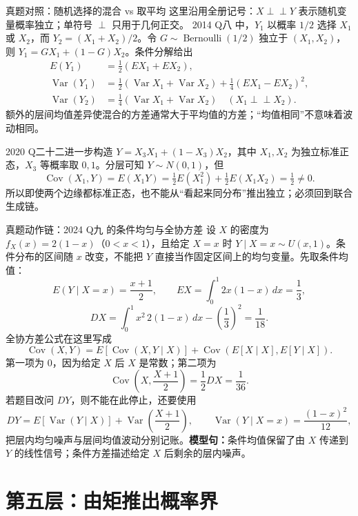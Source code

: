 \documentclass[11pt,a4paper]{ctexart}
\newcommand{\kw}[1]{\textbf{\color{deep}#1}}
\newcommand{\indep}{\mathrel{\perp\!\!\!\perp}}
\begin{document}
\begin{examplebox}{真题对照：随机选择的混合 vs 取平均}
这里沿用全册记号：$X\indep Y$ 表示随机变量概率独立；单符号 $\perp$ 只用于几何正交。
2014 Q八 中，$Y_1$ 以概率 $1/2$ 选择 $X_1$ 或 $X_2$，而 $Y_2=(X_1+X_2)/2$。令 $G\sim\operatorname{Bernoulli}(1/2)$ 独立于 $(X_1,X_2)$，则 $Y_1=GX_1+(1-G)X_2$。条件分解给出
\[
\begin{aligned}
E(Y_1)&=\tfrac12(E X_1+E X_2),\\
\operatorname{Var}(Y_1)&=\tfrac12(\operatorname{Var}X_1+\operatorname{Var}X_2)
 +\tfrac14(E X_1-E X_2)^2,\\
\operatorname{Var}(Y_2)&=\tfrac14(\operatorname{Var}X_1+\operatorname{Var}X_2)
\quad(X_1\indep X_2).
\end{aligned}
\]
额外的层间均值差异使混合的方差通常大于平均值的方差；“均值相同”不意味着波动相同。

2020 Q二十二进一步构造 $Y=X_3X_1+(1-X_3)X_2$，其中 $X_1,X_2$ 为独立标准正态，$X_3$ 等概率取 $0,1$。分层可知 $Y\sim N(0,1)$，但
\[
\operatorname{Cov}(X_1,Y)=E(X_1Y)=\tfrac12E(X_1^2)+\tfrac12E(X_1X_2)=\tfrac12\ne0.
\]
所以即使两个边缘都标准正态，也不能从“看起来同分布”推出独立；必须回到联合生成链。
\end{examplebox}

\begin{examplebox}{真题动作链：2024 Q九 的条件均匀与全协方差}
设 $X$ 的密度为 $f_X(x)=2(1-x)$（$0<x<1$），且给定 $X=x$ 时
$Y\mid X=x\sim U(x,1)$。条件分布的区间随 $x$ 改变，不能把 $Y$
直接当作固定区间上的均匀变量。先取条件均值：
\[
E(Y\mid X=x)=\frac{x+1}{2},\qquad EX=\int_0^1 2x(1-x)\,dx=\frac13,
\]
\[
DX=\int_0^1x^2\,2(1-x)\,dx-\left(\frac13\right)^2=\frac1{18}.
\]
全协方差公式在这里写成
\[
\operatorname{Cov}(X,Y)
=E[\operatorname{Cov}(X,Y\mid X)]
 +\operatorname{Cov}(E[X\mid X],E[Y\mid X]).
\]
第一项为 $0$，因为给定 $X$ 后 $X$ 是常数；第二项为
\[
\operatorname{Cov}\left(X,\frac{X+1}{2}\right)=\frac12DX=\frac1{36}.
\]
若题目改问 $DY$，则不能在此停止，还要使用
\[
DY=E[\operatorname{Var}(Y\mid X)]+\operatorname{Var}\left(\frac{X+1}{2}\right),
\qquad \operatorname{Var}(Y\mid X=x)=\frac{(1-x)^2}{12},
\]
把层内均匀噪声与层间均值波动分别记账。\kw{模型句：}条件均值保留了由 $X$ 传递到 $Y$ 的线性信号；条件方差描述给定 $X$ 后剩余的层内噪声。
\end{examplebox}

\section{第五层：由矩推出概率界}
\end{document}
